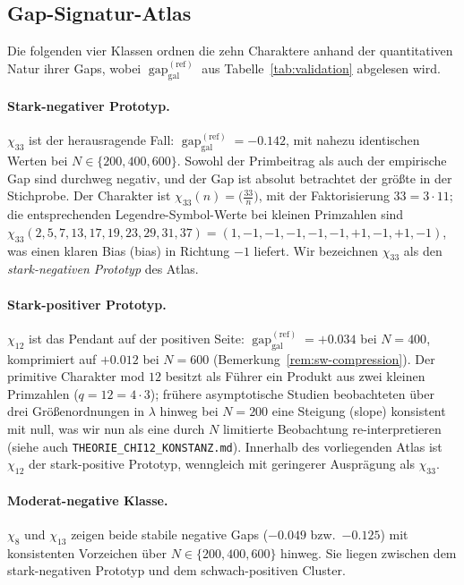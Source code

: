 \documentclass[10pt,twocolumn]{article}
\theoremstyle{definition}
\theoremstyle{remark}
\newcommand{\gap}{\operatorname{gap}}
\newcommand{\chifn}{\chi}
\begin{document}
\subsection{Gap-Signatur-Atlas}
\label{sec:gapsig}

Die folgenden vier Klassen ordnen die zehn Charaktere anhand der
quantitativen Natur ihrer Gaps, wobei $\gap_{\mathrm{gal}}^{(\mathrm{ref})}$ aus
Tabelle~\ref{tab:validation} abgelesen wird.

\paragraph{Stark-negativer Prototyp.}
$\chifn_{33}$ ist der herausragende Fall:
$\gap_{\mathrm{gal}}^{(\mathrm{ref})}=-0.142$, mit nahezu identischen Werten bei
$N\in\{200,400,600\}$. Sowohl der Primbeitrag als auch der empirische Gap
sind durchweg negativ, und der Gap ist absolut betrachtet der größte
in der Stichprobe. Der Charakter ist
$\chifn_{33}(n)=\bigl(\tfrac{33}{n}\bigr)$, mit der Faktorisierung
$33=3\cdot 11$; die entsprechenden Legendre-Symbol-Werte bei kleinen
Primzahlen sind $\chifn_{33}(2,5,7,13,17,19,23,29,31,37)=
(1,-1,-1,-1,-1,-1,+1,-1,+1,-1)$, was einen klaren Bias (bias) in Richtung
$-1$ liefert. Wir bezeichnen $\chifn_{33}$ als den \emph{stark-negativen
Prototyp} des Atlas.

\paragraph{Stark-positiver Prototyp.}
$\chifn_{12}$ ist das Pendant auf der positiven Seite:
$\gap_{\mathrm{gal}}^{(\mathrm{ref})}=+0.034$ bei $N=400$, komprimiert auf $+0.012$ bei
$N=600$ (Bemerkung~\ref{rem:sw-compression}). Der primitive Charakter
mod $12$ besitzt als Führer ein Produkt aus zwei kleinen Primzahlen ($q=12=
4\cdot 3$); frühere asymptotische Studien \cite{AsymptoticScan} beobachteten
über drei Größenordnungen in $\lambda$ hinweg bei $N=200$ eine Steigung (slope) konsistent mit null,
was wir nun als eine durch $N$ limitierte
Beobachtung re-interpretieren (siehe auch \texttt{THEORIE\_CHI12\_KONSTANZ.md}). Innerhalb
des vorliegenden Atlas ist $\chifn_{12}$ der stark-positive Prototyp,
wenngleich mit geringerer Ausprägung als $\chifn_{33}$.

\paragraph{Moderat-negative Klasse.}
$\chifn_8$ und $\chifn_{13}$ zeigen beide stabile negative Gaps
($-0.049$ bzw.\ $-0.125$) mit konsistenten Vorzeichen über
$N\in\{200,400,600\}$ hinweg. Sie liegen zwischen dem stark-negativen
Prototyp und dem schwach-positiven Cluster.
\end{document}
